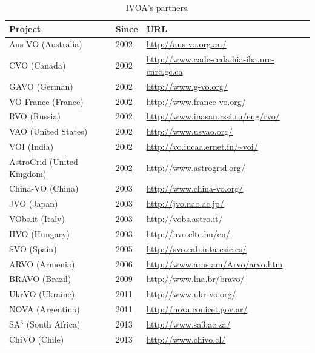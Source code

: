 \scriptsize
\begin{table}[h]
\centering
\begin{tabular}{|l|l|l|}
	\hline
	\textbf{Project} & \textbf{Since} & %
\textbf{URL} \\
	\hline
	Aus-VO (Australia) & 2002 & %
		\url{http://aus-vo.org.au/} \\
	\hline
   CVO (Canada) & 2002 & %
   	\url{http://www.cadc-ccda.hia-iha.nrc-cnrc.gc.ca} \\
	\hline
	GAVO (German) & 2002 & %
		\url{http://www.g-vo.org/} \\
	\hline
	VO-France (France) & 2002 & %
		\url{http://www.france-vo.org/} \\
	\hline
	RVO (Russia) & 2002 & %
		\url{http://www.inasan.rssi.ru/eng/rvo/} \\
	\hline
	VAO (United States) & 2002 & %
		 \url{http://www.usvao.org/} \\
	\hline
	VOI (India) & 2002 & %
		\url{http://vo.iucaa.ernet.in/~voi/} \\
	\hline
	AstroGrid (United Kingdom) & 2002 & %
		\url{http://www.astrogrid.org/} \\
	\hline
   China-VO (China) & 2003 & %
   \url{http://www.china-vo.org/} \\
	\hline
	JVO (Japan) & 2003 &%
		\url{http://jvo.nao.ac.jp/}\\
	\hline
	VObs.it (Italy) & 2003 & %
		\url{http://vobs.astro.it/} \\
	\hline
	HVO (Hungary) & 2003 & %
 		\url{http://hvo.elte.hu/en/} \\
	\hline
	SVO (Spain) & 2005 & %
		\url{http://svo.cab.inta-csic.es/} \\
	\hline
	ARVO (Armenia) & 2006 & %
		\url{http://www.aras.am/Arvo/arvo.htm} \\
	\hline
	BRAVO (Brazil) & 2009 & %
		\url{http://www.lna.br/bravo/} \\
	\hline
	UkrVO (Ukraine) & 2011 & %
		\url{http://www.ukr-vo.org/} \\
	\hline
	NOVA (Argentina) & 2011 & %
		\url{http://nova.conicet.gov.ar/} \\
	\hline
	SA$^3$ (South Africa) & 2013 & %
		\url{http://www.sa3.ac.za/} \\
	\hline
    ChiVO (Chile) & 2013 & %
		\url{http://www.chivo.cl/} \\
	\hline
\end{tabular}
\caption{IVOA's partners.}
\label{table:partners}
\end{table}
